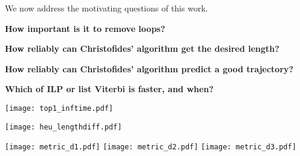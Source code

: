 
We now address the motivating questions of this work.

\textbf{How important is it to remove loops?}

\textbf{How reliably can Christofides' algorithm get the desired length?}

\textbf{How reliably can Christofides' algorithm predict a good trajectory?}

\textbf{Which of ILP or list Viterbi is faster, and when?}



\begin{figure*}[!t]
		\centering
		\texttt{[image: top1\_inftime.pdf]}
	    \label{fig:inftime}
\end{figure*}
\begin{figure*}[!t]
		\centering
		\texttt{[image: heu\_lengthdiff.pdf]}
	    \label{fig:inftime}
\end{figure*}

\begin{figure*}[!t]
		\centering
		\texttt{[image: metric\_d1.pdf]}
		\texttt{[image: metric\_d2.pdf]}
		\texttt{[image: metric\_d3.pdf]}
	    \label{fig:inftime}
\end{figure*}
